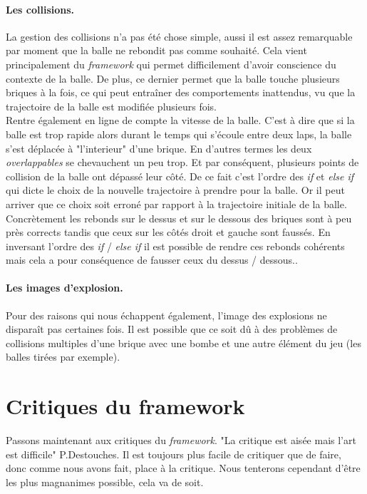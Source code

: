 \documentclass[a4paper,10pt]{article}
\begin{document}
\paragraph{Les collisions.}
La gestion des collisions n'a pas été chose simple, aussi il est assez remarquable par moment que la balle
ne rebondit pas comme souhaité. Cela vient principalement du \textit{framework} qui permet difficilement d'avoir
conscience du contexte de la balle. De plus, ce dernier permet que la balle touche plusieurs briques à la fois,
ce qui peut entraîner des comportements inattendus, vu que la trajectoire de la balle est modifiée plusieurs fois. \\
Rentre également en ligne de compte la vitesse de la balle. C'est à dire que si la balle est trop rapide alors durant
le temps qui s'écoule entre deux laps, la balle s'est déplacée à "l'interieur" d'une brique. En d'autres termes les
deux \textit{overlappables} se chevauchent un peu trop. Et par conséquent, plusieurs
points de collision de la balle ont dépassé leur côté. De ce fait c'est l'ordre des \textit{if} et \textit{else if} qui dicte
le choix de la nouvelle trajectoire à prendre pour la balle. Or il peut arriver que ce choix soit erroné par rapport à la
trajectoire initiale de la balle.\\
Concrètement les rebonds sur le dessus et sur le dessous des briques sont à peu près corrects tandis que ceux sur 
les côtés droit et gauche sont faussés. En inversant l'ordre des \textit{if} / \textit{else if} il est possible de rendre
ces rebonds cohérents mais cela a pour conséquence de fausser ceux du dessus / dessous..

\paragraph{Les images d'explosion.}
Pour des raisons qui nous échappent également, l'image des explosions ne disparaît pas certaines fois. Il est possible
que ce soit dû à des problèmes de collisions multiples d'une brique avec une bombe et une autre élément du jeu (les
balles tirées par exemple).


\section{Critiques du framework }
    Passons maintenant aux critiques du \textit{framework}. "La critique est aisée mais l'art est difficile" P.Destouches.
    Il est toujours plus facile de critiquer que de faire, donc comme nous avons fait, place à la critique. Nous tenterons
    cependant d'être les plus magnanimes possible, cela va de soit.
\end{document}

